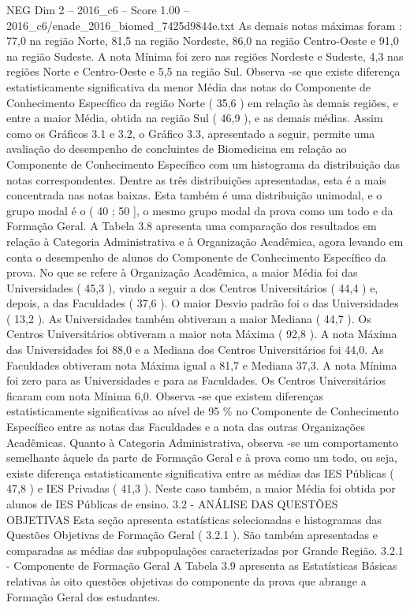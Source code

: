 \begin{textsample}{NEG Dim 2 – 2016\_c6 – Score 1.00 – 2016\_c6/enade\_2016\_biomed\_7425d9844e.txt}
As demais notas máximas foram : 77,0 na região Norte, 81,5 na região Nordeste, 86,0 na região Centro-Oeste e 91,0 na região Sudeste.
A nota Mínima foi zero nas regiões Nordeste e Sudeste, 4,3 nas regiões Norte e Centro-Oeste e 5,5 na região Sul.
Observa -se que existe diferença estatisticamente significativa da menor Média das notas do Componente de Conhecimento Específico da região Norte ( 35,6 ) em relação às demais regiões, e entre a maior Média, obtida na região Sul ( 46,9 ), e as demais médias.
Assim como os Gráficos 3.1 e 3.2, o Gráfico 3.3, apresentado a seguir, permite uma avaliação do desempenho de concluintes de Biomedicina em relação ao Componente de Conhecimento Específico com um histograma da distribuição das notas correspondentes.
Dentre as três distribuições apresentadas, esta é a mais concentrada nas notas baixas.
Esta também é uma distribuição unimodal, e o grupo modal é o ( 40 ; 50 ], o mesmo grupo modal da prova como um todo e da Formação Geral.
A Tabela 3.8 apresenta uma comparação dos resultados em relação à Categoria Administrativa e à Organização Acadêmica, agora levando em conta o desempenho de alunos do Componente de Conhecimento Específico da prova.
No que se refere à Organização Acadêmica, a maior Média foi das Universidades ( 45,3 ), vindo a seguir a dos Centros Universitários ( 44,4 ) e, depois, a das Faculdades ( 37,6 ).
O maior Desvio padrão foi o das Universidades ( 13,2 ).
As Universidades também obtiveram a maior Mediana ( 44,7 ).
Os Centros Universitários obtiveram a maior nota Máxima ( 92,8 ).
A nota Máxima das Universidades foi 88,0 e a Mediana dos Centros Universitários foi 44,0.
As Faculdades obtiveram nota Máxima igual a 81,7 e Mediana 37,3.
A nota Mínima foi zero para as Universidades e para as Faculdades.
Os Centros Universitários ficaram com nota Mínima 6,0.
Observa -se que existem diferenças estatisticamente significativas ao nível de 95 \% no Componente de Conhecimento Específico entre as notas das Faculdades e a nota das outras Organizações Acadêmicas.
Quanto à Categoria Administrativa, observa -se um comportamento semelhante àquele da parte de Formação Geral e à prova como um todo, ou seja, existe diferença estatisticamente significativa entre as médias das IES Públicas ( 47,8 ) e IES Privadas ( 41,3 ).
Neste caso também, a maior Média foi obtida por alunos de IES Públicas de ensino. 3.2 - ANÁLISE DAS QUESTÕES OBJETIVAS Esta seção apresenta estatísticas selecionadas e histogramas das Questões Objetivas de Formação Geral ( 3.2.1 ).
São também apresentadas e comparadas as médias das subpopulações caracterizadas por Grande Região. 3.2.1 - Componente de Formação Geral A Tabela 3.9 apresenta as Estatísticas Básicas relativas às oito questões objetivas do componente da prova que abrange a Formação Geral dos estudantes.

\end{textsample}
